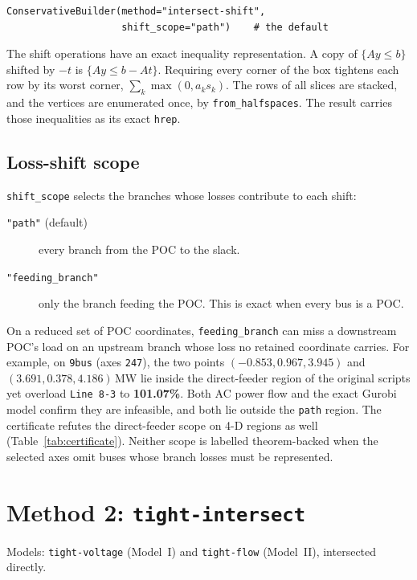 \documentclass[11pt,a4paper]{report}
\newcommand{\why}[1]{\par\medskip\begingroup\noindent #1\par\endgroup\medskip}
\newcommand{\trap}[1]{\begin{warnbox}#1\end{warnbox}}
\newcommand{\code}[1]{\texttt{\small #1}}
\begin{document}
\begin{lstlisting}
ConservativeBuilder(method="intersect-shift",
                    shift_scope="path")    # the default
\end{lstlisting}

\why{The shift operations have an exact inequality representation. A copy of
$\{Ay \le b\}$ shifted by $-t$ is $\{Ay \le b - At\}$. Requiring every
corner of the box tightens each row by its worst corner,
$\sum_k \max(0, a_k s_k)$. The rows of all slices are stacked, and the vertices
are enumerated once, by \code{from\_halfspaces}. The result carries those
inequalities as its exact \code{hrep}.}

\subsection{Loss-shift scope}
\label{sec:shiftscope}

\code{shift\_scope} selects the branches whose losses contribute to each shift:

\begin{description}
\item[\code{"path"} (default)] every branch from the POC to the slack.
\item[\code{"feeding\_branch"}] only the branch feeding the POC. This is exact
  when every bus is a POC.
\end{description}

\trap{On a reduced set of POC coordinates, \code{feeding\_branch} can miss a
downstream POC's load on an upstream branch whose loss no retained coordinate
carries. For example, on \code{9bus} (axes \code{247}), the two points
$(-0.853, 0.967, 3.945)$ and $(3.691, 0.378, 4.186)$\,MW lie inside the
direct-feeder region of the original scripts yet overload \code{Line 8-3} to
\textbf{101.07\%}. Both AC power flow and the exact Gurobi
model confirm they are infeasible, and both lie outside the \code{path}
region. The certificate refutes
the direct-feeder scope on 4-D regions as well (Table~\ref{tab:certificate}).
Neither scope is labelled theorem-backed when the selected axes omit buses
whose branch losses must be represented.}

\section{Method 2: \code{tight-intersect}}
\label{sec:method2}

Models: \code{tight-voltage} (Model~I) and \code{tight-flow} (Model~II),
intersected directly.
\end{document}
